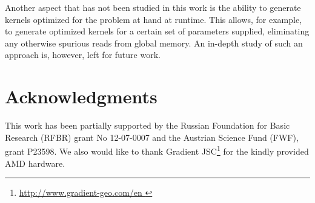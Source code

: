 \documentclass[final]{siamltex}
\begin{document}
Another aspect that has not been studied in this work is the ability to generate kernels
optimized for the problem at hand at runtime. This allows, for example, to generate
optimized kernels for a certain set of parameters supplied, eliminating any otherwise spurious reads from global memory.
An in-depth study of such an approach is, however, left for future work.





\section{Acknowledgments}

This work has been partially supported by the Russian Foundation for Basic
Research (RFBR) grant No 12-07-0007 and the Austrian Science Fund (FWF), grant P23598.
We also would like to thank Gradient JSC\footnote{ \href{
http://www.gradient-geo.com/en }{ http://www.gradient-geo.com/en } } for the
kindly provided AMD hardware.




\end{document}
